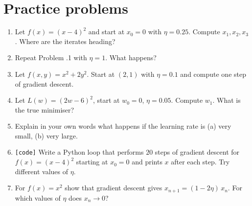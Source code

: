 \section*{Practice problems}
\begin{enumerate}[label=\textbf{\thechapter.\arabic*}]
  \item Let $f(x)=(x-4)^2$ and start at $x_0=0$ with $\eta=0.25$. Compute $x_1,x_2,x_3$. Where are the iterates heading?
  \item Repeat Problem \thechapter.1 with $\eta=1$. What happens?
  \item Let $f(x,y)=x^2+2y^2$. Start at $(2,1)$ with $\eta=0.1$ and compute one step of gradient descent.
  \item Let $L(w)=(2w-6)^2$, start at $w_0=0$, $\eta=0.05$. Compute $w_1$. What is the true minimiser?
  \item Explain in your own words what happens if the learning rate is (a) very small, (b) very large.
  \item[\textbf{\thechapter.6}] \texttt{[code]} Write a Python loop that performs $20$ steps of gradient descent for $f(x)=(x-4)^2$ starting at $x_0=0$ and prints $x$ after each step. Try different values of $\eta$.
  \item[\textbf{\thechapter.7}$\star$] For $f(x)=x^2$ show that gradient descent gives $x_{n+1}=(1-2\eta)\,x_n$. For which values of $\eta$ does $x_n\to0$?
\end{enumerate}

